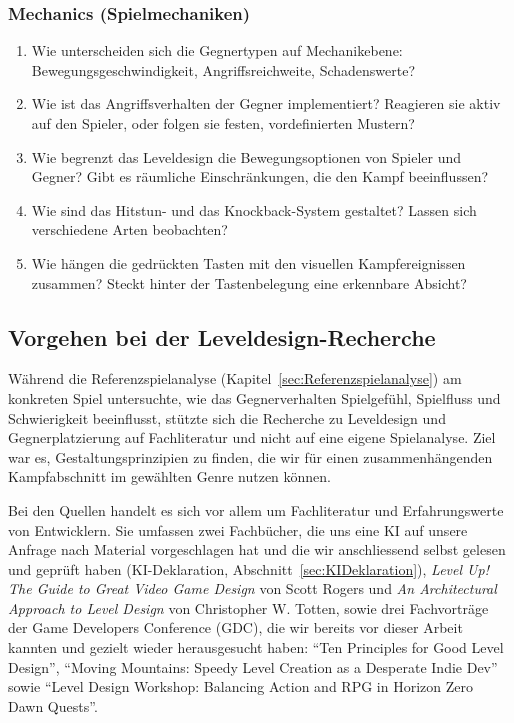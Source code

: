 \documentclass[../Main.tex]{subfiles}
\begin{document}
\subsubsection{Mechanics (Spielmechaniken)}

\begin{enumerate}[label=\textbf{M\arabic*}, leftmargin=1.5cm, itemsep=0.5em]
    \item Wie unterscheiden sich die Gegnertypen auf Mechanikebene: Bewegungsgeschwindigkeit, Angriffsreichweite, Schadenswerte?
    \item Wie ist das Angriffsverhalten der Gegner implementiert? Reagieren sie aktiv auf den Spieler, oder folgen sie festen, vordefinierten Mustern?
    \item Wie begrenzt das Leveldesign die Bewegungsoptionen von Spieler und Gegner? Gibt es räumliche Einschränkungen, die den Kampf beeinflussen?
    \item Wie sind das Hitstun- und das Knockback-System gestaltet? Lassen sich verschiedene Arten beobachten?
    \item Wie hängen die gedrückten Tasten mit den visuellen Kampfereignissen zusammen? Steckt hinter der Tastenbelegung eine erkennbare Absicht?
\end{enumerate}

\subsection{Vorgehen bei der Leveldesign-Recherche} \label{sec:VorgehenLeveldesign}
Während die Referenzspielanalyse (Kapitel~\ref{sec:Referenzspielanalyse}) am konkreten Spiel untersuchte, wie das Gegnerverhalten Spielgefühl, Spielfluss und Schwierigkeit beeinflusst, stützte sich die Recherche zu Leveldesign und Gegnerplatzierung auf Fachliteratur und nicht auf eine eigene Spielanalyse. Ziel war es, Gestaltungsprinzipien zu finden, die wir für einen zusammenhängenden Kampfabschnitt im gewählten Genre nutzen können.

Bei den Quellen handelt es sich vor allem um Fachliteratur und Erfahrungswerte von Entwicklern. Sie umfassen zwei Fachbücher, die uns eine KI auf unsere Anfrage nach Material vorgeschlagen hat und die wir anschliessend selbst gelesen und geprüft haben (KI-Deklaration, Abschnitt~\ref{sec:KIDeklaration}), \textit{Level Up! The Guide to Great Video Game Design} von Scott Rogers\autocite{rogers2014levelup} und \textit{An Architectural Approach to Level Design} von Christopher W. Totten\autocite{totten2014architectural}, sowie drei Fachvorträge der Game Developers Conference (GDC), die wir bereits vor dieser Arbeit kannten und gezielt wieder herausgesucht haben: \enquote{Ten Principles for Good Level Design}\autocite{gdc_tenprinciples2010}, \enquote{Moving Mountains: Speedy Level Creation as a Desperate Indie Dev}\autocite{gdc_movingmountains2020} sowie \enquote{Level Design Workshop: Balancing Action and RPG in Horizon Zero Dawn Quests}\autocite{gdc_horizonquests2018}.
\end{document}
